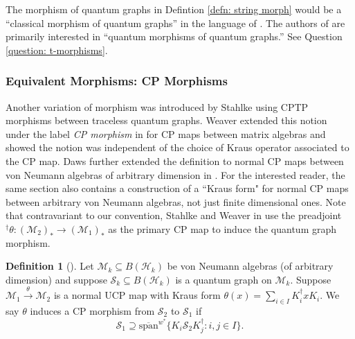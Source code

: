 \documentclass[12pt]{article}
\theoremstyle{definition}
\newtheorem{definition}[theorem]{Definition}
\newenvironment{remark}
  {\pushQED{\qed}\renewcommand{\qedsymbol}{\textcircled{\tiny R}}\remarkx}
  {\popQED\endremarkx}
\newcommand{\Span}{\text{span}}
\newcommand{\mc}[1]{\mathcal{#1}}
\newcommand{\<}{\langle}
\renewcommand{\>}{\rangle}
\begin{document}
\begin{remark}
    The morphism of quantum graphs in Defintion \ref{defn: string morph} would be a ``classical morphism of quantum graphs'' in the language of \cite[Remark 5.5]{musto-reutter-verdon}. The authors of \cite{musto-reutter-verdon} are primarily interested in ``quantum morphisms of quantum graphs.'' See Question \ref{question: t-morphisms}.
\end{remark}

\subsubsection{Equivalent Morphisms: CP Morphisms}

Another variation of morphism was introduced by Stahlke \cite[Defintion 7]{stahlke} using CPTP morphisms between traceless quantum graphs. Weaver extended this notion under the label \textit{CP morphism} in \cite[Definition 8.5]{weavergraphsrelations} for CP maps between matrix algebras and showed the notion was independent of the choice of Kraus operator associated to the CP map. Daws further extended the definition to normal CP maps between von Neumann algebras of arbitrary dimension in \cite[Section 7]{daws}. For the interested reader, the same section also contains a construction of a ``Kraus form" for normal CP maps between arbitrary von Neumann algebras, not just finite dimensional ones. Note that contravariant to our convention, Stahlke and Weaver in use the preadjoint $^\dagger \theta: (\mc M_2)_* \to (\mc M_1)_*$ as the primary CP map to induce the quantum graph morphism.

\begin{definition} [] \label{defn: cp morphism}
    Let $\mc M_k \subseteq B(\mc H_k)$ be von Neumann algebras (of arbitrary dimension) and suppose $\mc S_k \subseteq B(\mc H_k)$ is a quantum graph on $\mc M_k$. Suppose $\mc M_1 \overset{\theta}{\to} \mc M_2$ is a normal UCP map with Kraus form $\theta(x) = \sum_{i \in I} K_i^\dagger x K_i$. We say $\theta$ induces a CP morphism from $\mc S_2$ to $\mc S_1$ if 
    \[
    \mc S_1 \supseteq \overline{\Span}^{w^*}\{K_i \mc S_2 K_j^\dagger : i,j \in I\}.
    \]
\end{definition}
\end{document}
